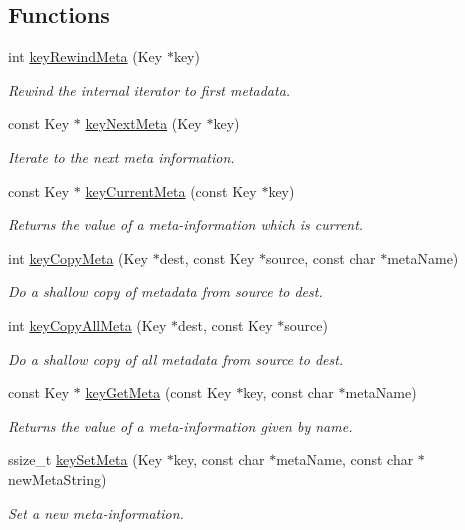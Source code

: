 \subsection*{Functions}
\begin{DoxyCompactItemize}
\item 
int \hyperlink{group__keymeta_ga5dbb669802eea27e106ee3a5e39717a9}{key\+Rewind\+Meta} (Key $\ast$key)
\begin{DoxyCompactList}\small\item\em Rewind the internal iterator to first metadata. \end{DoxyCompactList}\item 
const Key $\ast$ \hyperlink{group__keymeta_ga4c88342f580a4291455a801af71ce048}{key\+Next\+Meta} (Key $\ast$key)
\begin{DoxyCompactList}\small\item\em Iterate to the next meta information. \end{DoxyCompactList}\item 
const Key $\ast$ \hyperlink{group__keymeta_ga74a273f529030f4947df52e14fdd2869}{key\+Current\+Meta} (const Key $\ast$key)
\begin{DoxyCompactList}\small\item\em Returns the value of a meta-\/information which is current. \end{DoxyCompactList}\item 
int \hyperlink{group__keymeta_ga9a22b992478e613c8788bd460b4a1f0c}{key\+Copy\+Meta} (Key $\ast$dest, const Key $\ast$source, const char $\ast$meta\+Name)
\begin{DoxyCompactList}\small\item\em Do a shallow copy of metadata from source to dest. \end{DoxyCompactList}\item 
int \hyperlink{group__keymeta_ga8e63720a65610a29597494d0671f9401}{key\+Copy\+All\+Meta} (Key $\ast$dest, const Key $\ast$source)
\begin{DoxyCompactList}\small\item\em Do a shallow copy of all metadata from source to dest. \end{DoxyCompactList}\item 
const Key $\ast$ \hyperlink{group__keymeta_ga9ed3875495ddb3d8a8d29158a60a147c}{key\+Get\+Meta} (const Key $\ast$key, const char $\ast$meta\+Name)
\begin{DoxyCompactList}\small\item\em Returns the value of a meta-\/information given by name. \end{DoxyCompactList}\item 
ssize\+\_\+t \hyperlink{group__keymeta_gae1f15546b234ffb6007d8a31178652b9}{key\+Set\+Meta} (Key $\ast$key, const char $\ast$meta\+Name, const char $\ast$new\+Meta\+String)
\begin{DoxyCompactList}\small\item\em Set a new meta-\/information. \end{DoxyCompactList}\end{DoxyCompactItemize}


